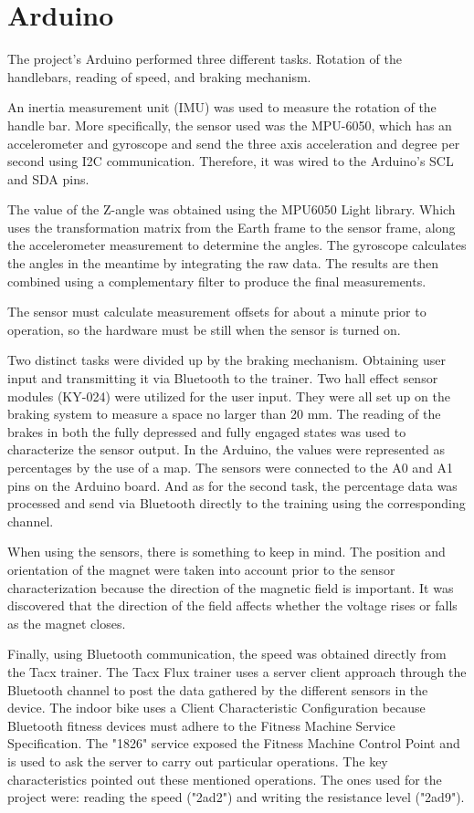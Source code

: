 \documentclass[english,notitlepage,smartquotes]{hgbreport}
\begin{document}
\section{Arduino}
The project's Arduino performed three different tasks. Rotation of the handlebars, reading of speed, and braking mechanism.

An inertia measurement unit (IMU) was used to measure the rotation of the handle bar. More specifically, the sensor used was the MPU-6050\cite{MPU6050}, which has an accelerometer and gyroscope and send the three axis acceleration and degree per second using I2C communication. Therefore, it was wired to the Arduino's SCL and SDA pins.

The value of the Z-angle was obtained using the MPU6050 Light library. Which uses the transformation matrix from the Earth frame to the sensor frame, along the accelerometer measurement to determine the angles. The gyroscope calculates the angles in the meantime by integrating the raw data. The results are then combined using a complementary filter to produce the final measurements\cite{MPU6050Light}.

The sensor must calculate measurement offsets for about a minute prior to operation, so the hardware must be still when the sensor is turned on.

Two distinct tasks were divided up by the braking mechanism. Obtaining user input and transmitting it via Bluetooth to the trainer.
Two hall effect sensor modules (KY-024) were utilized for the user input. They were all set up on the braking system to measure a space no larger than 20 mm. The reading of the brakes in both the fully depressed and fully engaged states was used to characterize the sensor output. In the Arduino, the values were represented as percentages by the use of a map. 
The sensors were connected to the A0 and A1 pins on the Arduino board.
And as for the second task, the percentage data was processed and send via Bluetooth directly to the training using the corresponding channel. 

When using the sensors, there is something to keep in mind. The position and orientation of the magnet were taken into account prior to the sensor characterization because the direction of the magnetic field is important. It was discovered that the direction of the field affects whether the voltage rises or falls as the magnet closes.


Finally, using Bluetooth communication, the speed was obtained directly from the Tacx trainer. 
The Tacx Flux trainer uses a server client approach through the Bluetooth channel to post the data gathered by the different sensors in the device.
The indoor bike uses a Client Characteristic Configuration because Bluetooth fitness devices must adhere to the Fitness Machine Service Specification\cite{FitnessMachineService}. The "1826" service exposed the Fitness Machine Control Point and is used to ask the server to carry out particular operations. The key characteristics pointed out these mentioned operations. The ones used for the project were: reading the speed ("2ad2") and writing the resistance level ("2ad9").
\end{document}
